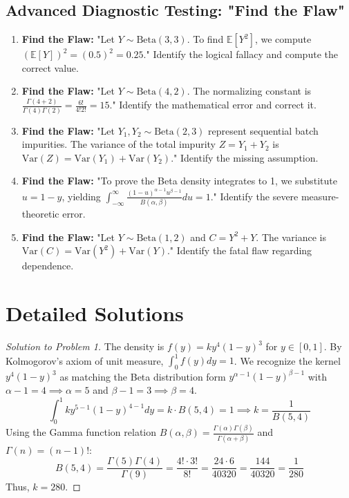 \documentclass[11pt, a4paper]{article}
\theoremstyle{definition}
\theoremstyle{remark}
\newcommand{\E}{\mathbb{E}}
\begin{document}
\subsection{Advanced Diagnostic Testing: "Find the Flaw"}
\begin{enumerate}[label=\textbf{\arabic*.}, resume]
    \item \textbf{Find the Flaw:} "Let $Y \sim \text{Beta}(3, 3)$. To find $\E[Y^2]$, we compute $(\E[Y])^2 = (0.5)^2 = 0.25$." Identify the logical fallacy and compute the correct value.
    \item \textbf{Find the Flaw:} "Let $Y \sim \text{Beta}(4, 2)$. The normalizing constant is $\frac{\Gamma(4+2)}{\Gamma(4)\Gamma(2)} = \frac{6!}{4!2!} = 15$." Identify the mathematical error and correct it.
    \item \textbf{Find the Flaw:} "Let $Y_1, Y_2 \sim \text{Beta}(2, 3)$ represent sequential batch impurities. The variance of the total impurity $Z = Y_1 + Y_2$ is $\text{Var}(Z) = \text{Var}(Y_1) + \text{Var}(Y_2)$." Identify the missing assumption.
    \item \textbf{Find the Flaw:} "To prove the Beta density integrates to 1, we substitute $u = 1-y$, yielding $\int_{-\infty}^{\infty} \frac{(1-u)^{\alpha-1} u^{\beta-1}}{B(\alpha, \beta)} du = 1$." Identify the severe measure-theoretic error.
    \item \textbf{Find the Flaw:} "Let $Y \sim \text{Beta}(1, 2)$ and $C = Y^2 + Y$. The variance is $\text{Var}(C) = \text{Var}(Y^2) + \text{Var}(Y)$." Identify the fatal flaw regarding dependence.
\end{enumerate}

\newpage
\section{Detailed Solutions}

\begin{proof}[Solution to Problem 1]
The density is $f(y) = k y^4 (1-y)^3$ for $y \in [0, 1]$. By Kolmogorov's axiom of unit measure, $\int_0^1 f(y) dy = 1$.
We recognize the kernel $y^4 (1-y)^3$ as matching the Beta distribution form $y^{\alpha-1}(1-y)^{\beta-1}$ with $\alpha - 1 = 4 \implies \alpha = 5$ and $\beta - 1 = 3 \implies \beta = 4$.
\[
\int_0^1 k y^{5-1} (1-y)^{4-1} dy = k \cdot B(5, 4) = 1 \implies k = \frac{1}{B(5, 4)}
\]
Using the Gamma function relation $B(\alpha, \beta) = \frac{\Gamma(\alpha)\Gamma(\beta)}{\Gamma(\alpha+\beta)}$ and $\Gamma(n) = (n-1)!$:
\[
B(5, 4) = \frac{\Gamma(5)\Gamma(4)}{\Gamma(9)} = \frac{4! \cdot 3!}{8!} = \frac{24 \cdot 6}{40320} = \frac{144}{40320} = \frac{1}{280}
\]
Thus, $k = 280$.
\end{proof}
\end{document}
